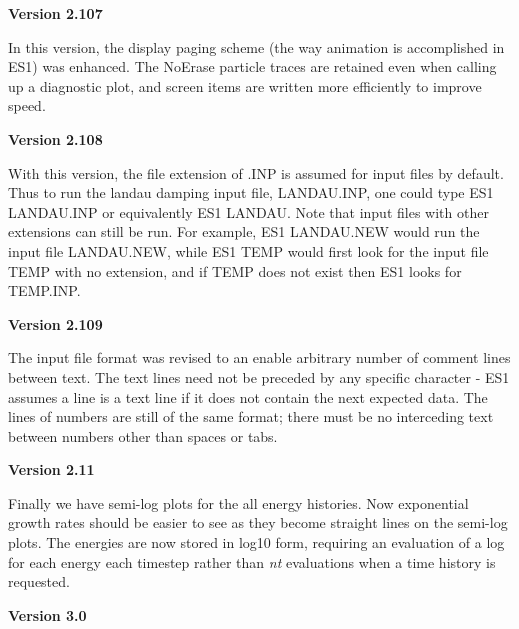\begin{section}
\begin{subsection}
\begin{subsubsection}
{\bf Version 2.107}

      In this version, the display paging scheme (the way animation is
      accomplished in ES1) was enhanced.  The NoErase particle traces are
      retained even when calling up a diagnostic plot, and screen items are
      written more efficiently to improve speed.
\end{subsubsection}

\begin{subsubsection}
{\bf Version 2.108}

      With this version, the file extension of .INP is assumed for input files
      by default.  Thus to run the landau damping input file, LANDAU.INP, one
      could type {\sc ES1 LANDAU.INP} or equivalently {\sc ES1 LANDAU}.  Note 
      that
      input files with other extensions can still be run.  For
      example, {\sc ES1 LANDAU.NEW} would run the input file LANDAU.NEW,
      while {\sc ES1 TEMP} would
      first look for the input file TEMP with no extension, and if TEMP does
      not exist then ES1 looks for TEMP.INP.
\end{subsubsection}

\begin{subsubsection}
{\bf Version 2.109}

      The input file format was revised to an enable arbitrary number of
      comment lines between text.  The text lines need not be preceded by any
      specific character - ES1 assumes a line is a text line if it does not
      contain the next expected data.  The lines of numbers are still of the
      same format; there must be no interceding text between numbers other than
      spaces or tabs.
\end{subsubsection}

\begin{subsubsection}
{\bf Version 2.11}

      Finally we have semi-log plots for the all energy histories.  Now
      exponential growth rates should be easier to see as they become straight
      lines on the semi-log plots.  The energies are now stored in log10 form,
      requiring an evaluation of a log for each energy each timestep rather
      than {\em nt} evaluations when a time history is requested.
\end{subsubsection}

\begin{subsubsection}
{\bf Version 3.0}


\end{subsubsection}
\end{subsection}
\end{section}
